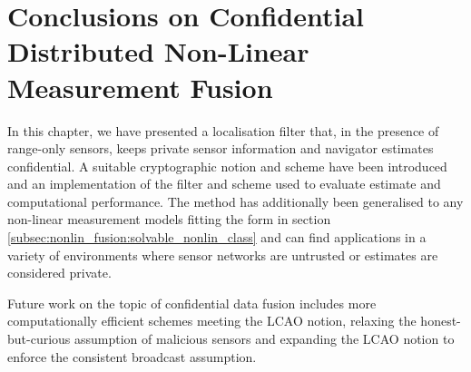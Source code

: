 % 
%                                               
%                                               
%                                               
% 

\section{Conclusions on Confidential Distributed Non-Linear Measurement Fusion}\label{sec:nonlin_fusion:conclusion}
In this chapter, we have presented a localisation filter that, in the presence of range-only sensors, keeps private sensor information and navigator estimates confidential. A suitable cryptographic notion and scheme have been introduced and an implementation of the filter and scheme used to evaluate estimate and computational performance. The method has additionally been generalised to any non-linear measurement models fitting the form in section \ref{subsec:nonlin_fusion:solvable_nonlin_class} and can find applications in a variety of environments where sensor networks are untrusted or estimates are considered private. 

Future work on the topic of confidential data fusion includes more computationally efficient schemes meeting the LCAO notion, relaxing the honest-but-curious assumption of malicious sensors and expanding the LCAO notion to enforce the consistent broadcast assumption.